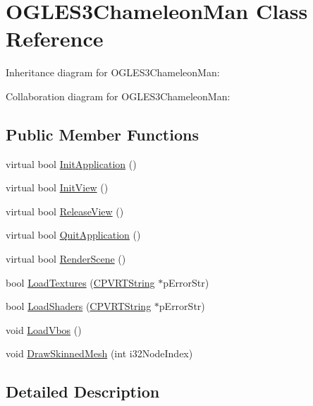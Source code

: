 \hypertarget{class_o_g_l_e_s3_chameleon_man}{\section{O\+G\+L\+E\+S3\+Chameleon\+Man Class Reference}
\label{class_o_g_l_e_s3_chameleon_man}
}


Inheritance diagram for O\+G\+L\+E\+S3\+Chameleon\+Man\+:


Collaboration diagram for O\+G\+L\+E\+S3\+Chameleon\+Man\+:
\subsection*{Public Member Functions}
\begin{DoxyCompactItemize}
\item 
virtual bool \hyperlink{class_o_g_l_e_s3_chameleon_man_a433dcf011bc4e2dc490f3cb4f91f3a34}{Init\+Application} ()
\item 
virtual bool \hyperlink{class_o_g_l_e_s3_chameleon_man_aa8a4178be34c7d23d11a7d4818c6fa7c}{Init\+View} ()
\item 
virtual bool \hyperlink{class_o_g_l_e_s3_chameleon_man_adc4c8c7cdd52e8f3495a4688374a0ead}{Release\+View} ()
\item 
virtual bool \hyperlink{class_o_g_l_e_s3_chameleon_man_abfadb7b30e774ac5a49aefbd7b11cdcf}{Quit\+Application} ()
\item 
virtual bool \hyperlink{class_o_g_l_e_s3_chameleon_man_a1dd55c368e019d3d6c95eb30070182d6}{Render\+Scene} ()
\item 
bool \hyperlink{class_o_g_l_e_s3_chameleon_man_a8619130b98baf8ad510cfe5270e0d606}{Load\+Textures} (\hyperlink{class_c_p_v_r_t_string}{C\+P\+V\+R\+T\+String} $\ast$p\+Error\+Str)
\item 
bool \hyperlink{class_o_g_l_e_s3_chameleon_man_aa6d67d577e7bbab7572f05658a6f2fa9}{Load\+Shaders} (\hyperlink{class_c_p_v_r_t_string}{C\+P\+V\+R\+T\+String} $\ast$p\+Error\+Str)
\item 
void \hyperlink{class_o_g_l_e_s3_chameleon_man_a511c60b63e899177caf0fb81a450ea34}{Load\+Vbos} ()
\item 
void \hyperlink{class_o_g_l_e_s3_chameleon_man_a048aefb0bd0b25c191c04b1acd9c16d3}{Draw\+Skinned\+Mesh} (int i32\+Node\+Index)
\end{DoxyCompactItemize}


\subsection{Detailed Description}


